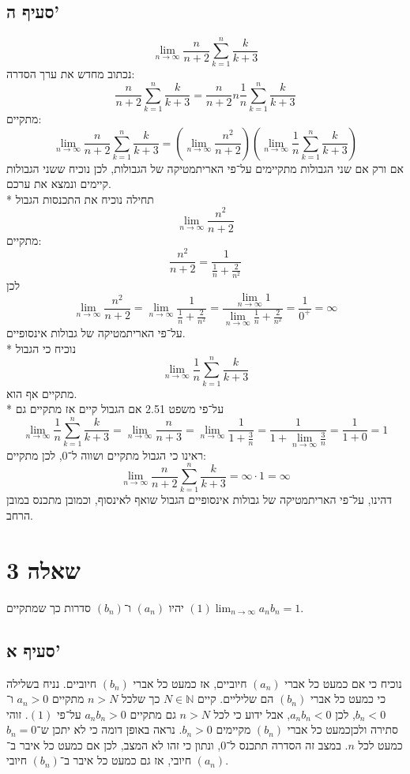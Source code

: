 \documentclass[a4paper]{article}
\def\NN{\mathbb{N}}
\begin{document}
\subsection{סעיף ה'}
\[
	\lim_{n \to \infty} \frac{n}{n + 2} \sum_{k = 1}^n \frac{k}{k + 3}
\]
נכתוב מחדש את ערך הסדרה:
\[
	\frac{n}{n + 2} \sum_{k = 1}^n \frac{k}{k + 3}
	= \frac{n}{n + 2} n \frac{1}{n} \sum_{k = 1}^n \frac{k}{k + 3}
\]
מתקיים:
\[
	\lim_{n \to \infty} \frac{n}{n + 2} \sum_{k = 1}^n \frac{k}{k + 3}
	=
	\left( \lim_{n \to \infty} \frac{n^2}{n + 2} \right)
	\left( \lim_{n \to \infty} \frac{1}{n}
	\sum_{k = 1}^n \frac{k}{k + 3} \right)
\]
אם ורק אם שני הגבולות מתקיימים על־פי האריתמטיקה של הגבולות,
לכן נוכיח ששני הגבולות קיימים ונמצא את ערכם. \\*
תחילה נוכיח את התכנסות הגבול
\[
	\lim_{n \to \infty} \frac{n^2}{n + 2}
\]
מתקיים:
\[
	\frac{n^2}{n + 2} = \frac{1}{\frac{1}{n} + \frac{2}{n^2}}
\]
לכן
\[
	\lim_{n \to \infty} \frac{n^2}{n + 2}
	= \lim_{n \to \infty} \frac{1}{\frac{1}{n} + \frac{2}{n^2}}
	= \frac{\lim_{n \to \infty} 1}{\lim_{n \to \infty}
	\frac{1}{n} + \frac{2}{n^2}}
	= \frac{1}{0^+}
	= \infty
\]
על־פי האריתמטיקה של גבולות אינסופיים. \\*
נוכיח כי הגבול
\[
	\lim_{n \to \infty} \frac{1}{n} \sum_{k = 1}^n \frac{k}{k + 3}
\]
מתקיים אף הוא. \\*
על־פי משפט 2.51 אם הגבול קיים אז מתקיים גם
\[
	\lim_{n \to \infty} \frac{1}{n} \sum_{k = 1}^n \frac{k}{k + 3}
	= \lim_{n \to \infty} \frac{n}{n + 3}
	= \lim_{n \to \infty} \frac{1}{1 + \frac{3}{n}}
	= \frac{1}{1 + \lim_{n \to \infty} \frac{3}{n}}
	= \frac{1}{1 + 0}
	= 1
\]
ראינו כי הגבול מתקיים ושווה ל־$0$,
לכן מתקיים:
\[
	\lim_{n \to \infty} \frac{n}{n + 2} \sum_{k = 1}^n \frac{k}{k + 3}
	= \infty \cdot 1
	= \infty
\]
דהינו, על־פי האריתמטיקה של גבולות אינסופיים הגבול שואף לאינסוף,
וכמובן מתכנס במובן הרחב.

\section{שאלה 3}
יהיו $(a_n)$ ו־$(b_n)$ סדרות כך שמתקיים $(1) \lim_{n \to \infty} a_n b_n = 1$.

\subsection{סעיף א'}
נוכיח כי אם כמעט כל אברי $(a_n)$ חיוביים, אז כמעט כל אברי $(b_n)$ חיוביים.
נניח בשלילה כי כמעט כל אברי $(b_n)$ הם שליליים. קיים $N \in \NN$
כך שלכל $n > N$ מתקיים $a_n > 0$ ו־$b_n < 0$, לכן $a_n b_n < 0$,
אבל ידוע כי לכל $n > N$ גם מתקיים $a_n b_n > 0$ על־פי $(1)$.
זוהי סתירה ולכןכמעט כל אברי $(b_n)$ מקיימים $b_n > 0$.
נראה באופן דומה כי לא יתכן ש־$b_n = 0$ כמעט לכל $n$.
במצב זה הסדרה תתכנס ל־$0$, ונתון כי זהו לא המצב,
לכן אם כמעט כל איבר ב־$(a_n)$ חיובי, אז גם כמעט כל איבר ב־$(b_n)$ חיובי.
\end{document}
